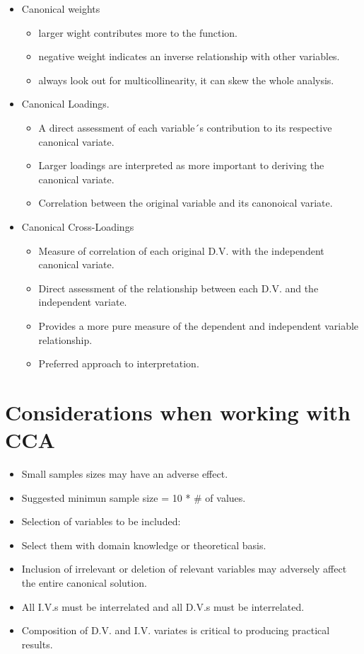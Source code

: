 \documentclass[]{book}
\providecommand{\tightlist}{%
  \setlength{\itemsep}{0pt}\setlength{\parskip}{0pt}}
\begin{document}
\begin{itemize}
\tightlist
\item
  Canonical weights

  \begin{itemize}
  \tightlist
  \item
    larger wight contributes more to the function.
  \item
    negative weight indicates an inverse relationship with other
    variables.
  \item
    always look out for multicollinearity, it can skew the whole
    analysis.
  \end{itemize}
\item
  Canonical Loadings.

  \begin{itemize}
  \tightlist
  \item
    A direct assessment of each variable´s contribution to its
    respective canonical variate.
  \item
    Larger loadings are interpreted as more important to deriving the
    canonical variate.
  \item
    Correlation between the original variable and its canonoical
    variate.
  \end{itemize}
\item
  Canonical Cross-Loadings

  \begin{itemize}
  \tightlist
  \item
    Measure of correlation of each original D.V. with the independent
    canonical variate.
  \item
    Direct assessment of the relationship between each D.V. and the
    independent variate.
  \item
    Provides a more pure measure of the dependent and independent
    variable relationship.
  \item
    Preferred approach to interpretation.
  \end{itemize}
\end{itemize}

\section{Considerations when working with
CCA}\label{considerations-when-working-with-cca}

\begin{itemize}
\tightlist
\item
  Small samples sizes may have an adverse effect.
\item
  Suggested minimun sample size = 10 * \# of values.
\item
  Selection of variables to be included:
\item
  Select them with domain knowledge or theoretical basis.
\item
  Inclusion of irrelevant or deletion of relevant variables may
  adversely affect the entire canonical solution.
\item
  All I.V.s must be interrelated and all D.V.s must be interrelated.
\item
  Composition of D.V. and I.V. variates is critical to producing
  practical results.
\end{itemize}
\end{document}
